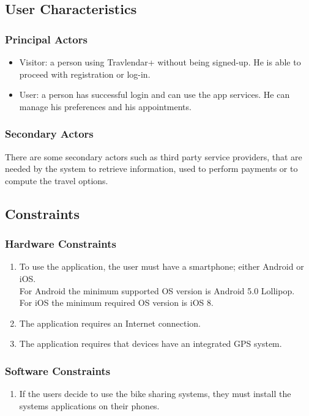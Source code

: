 \begin{list}
\end{list}

\subsection{User Characteristics}

\subsubsection{Principal Actors}

\renewcommand{\labelitemi}{$-$}
\begin{itemize}
\item
Visitor: a person using Travlendar+ without being signed-up. He is able to proceed with registration or log-in.
\item
User: a person has successful login and can use the app services. He can manage his preferences and his appointments.
\end{itemize}

\subsubsection{Secondary Actors}
There are some secondary actors such as third party service providers, that are needed by the system to retrieve information, used to perform payments or to compute the travel options. 


\subsection{Constraints}
\subsubsection{Hardware Constraints}
\begin{enumerate}
\item
To use the application, the user must have a smartphone; either Android or iOS.\\
For Android the minimum supported OS version is Android 5.0 Lollipop.\\
For iOS the minimum required OS version is iOS 8.
\item
The application requires an Internet connection.
\item
The application requires that devices have an integrated GPS system.
\end{enumerate}

\subsubsection{Software Constraints}
\begin{enumerate}
\item
If the users decide to use the bike sharing systems, they must install the systems applications on their phones.
\end{enumerate}

